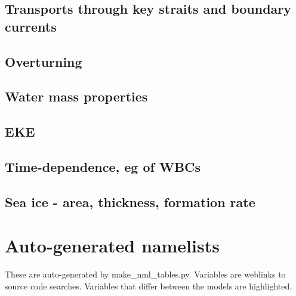 \documentclass[11pt]{article}
\begin{document}
\subsection{Transports through key straits and boundary currents}

\subsection{Overturning}

\subsection{Water mass properties}

\subsection{EKE}

\subsection{Time-dependence, eg of WBCs}

\subsection{Sea ice - area, thickness, formation rate}

\appendix
\section{Auto-generated namelists}


\newcommand{\nmldiffer}[1]{\colorbox{hilite}{#1}}\setlength{\fboxsep}{0pt} %
\newcommand{\nmllink}[2]{#1} %
\newcommand{\nml}[1]{{\small\textsf{}}}
\newlength{\nmllen}\setlength{\nmllen}{13ex}

These are auto-generated by make\_nml\_tables.py.
Variables are \textcolor{link}{weblinks} to source code searches. Variables that differ between the models are \nmldiffer{\textcolor{link}{highlighted}}.
\end{document}
